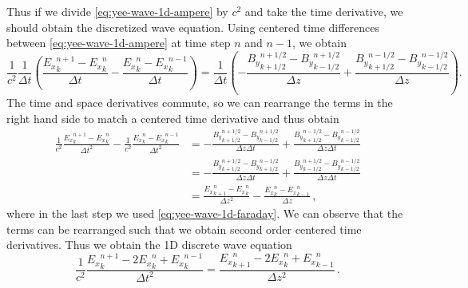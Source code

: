 \documentclass[12pt, class=report, crop=false]{standalone}
\begin{document}
Thus if we divide \cref{eq:yee-wave-1d-ampere} by \(c^2\) and take the time derivative,
we should obtain the discretized wave equation. Using centered time differences
between \cref{eq:yee-wave-1d-ampere} at time step \(n\) and \(n-1\), we obtain
\[
\frac{1}{c^2} \frac{1}{\Delta t} \left(\frac{{E_x}^{n+1}_k - {E_x}^n_k}{\Delta t}
- \frac{{E_x}^{n}_k - {E_x}^{n-1}_k}{\Delta t}\right) =
\frac{1}{\Delta t} \left(-\frac{{B_y}^{n+1/2}_{k+1/2} - {B_y}^{n+1/2}_{k-1/2}}{\Delta z}
+ \frac{{B_y}^{n-1/2}_{k+1/2} - {B_y}^{n-1/2}_{k-1/2}}{\Delta z}\right).
\]
The time and space derivatives commute, so we can rearrange the terms in the
right hand side to match a centered time derivative and thus obtain
\[
\begin{aligned}
  \frac{1}{c^2}\frac{{E_x}^{n+1}_k - {E_x}^n_k}{\Delta t^2}
- \frac{1}{c^2}\frac{{E_x}^{n}_k - {E_x}^{n-1}_k}{\Delta t^2} &=
- \frac{{B_y}^{n+1/2}_{k+1/2} - {B_y}^{n+1/2}_{k-1/2}}{\Delta z \Delta t}
+ \frac{{B_y}^{n-1/2}_{k+1/2} - {B_y}^{n-1/2}_{k-1/2}}{\Delta z \Delta t} \\&=
- \frac{{B_y}^{n+1/2}_{k+1/2} - {B_y}^{n-1/2}_{k+1/2}}{\Delta z \Delta t}
+ \frac{{B_y}^{n+1/2}_{k-1/2} - {B_y}^{n-1/2}_{k-1/2}}{\Delta z \Delta t} \\&=
  \frac{{E_x}^n_{k+1} - {E_x}^n_k}{\Delta z^2} - \frac{{E_x}^n_{k} - {E_x}^n_{k-1}}{\Delta z}\,,
\end{aligned}
\]
where in the last step we used \cref{eq:yee-wave-1d-faraday}. We can observe
that the terms can be rearranged such that we obtain second order centered time
derivatives. Thus we obtain the 1D discrete wave equation
\begin{equation}
\label{eq:discrete-wave-1d}
\frac{1}{c^2} \frac{{E_x}^{n+1}_k - 2{E_x}^n_k + {E_x}^{n-1}_k}{\Delta t^2} =
\frac{{E_x}^n_{k+1} - 2{E_x}^n_k + {E_x}^n_{k-1}}{\Delta z^2}\,.
\end{equation}
\end{document}
